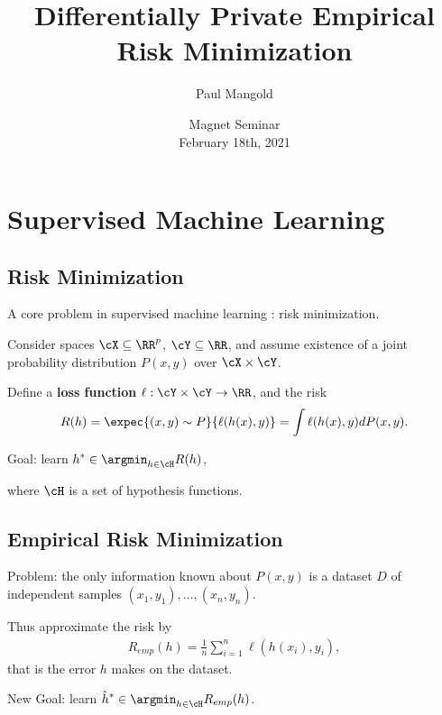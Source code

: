 \documentclass[notheorems]{beamer}
\title{Differentially Private Empirical Risk Minimization}
\author{Paul Mangold}
\date{Magnet Seminar \\[1em]
  February 18th, 2021}
\begin{document}

\begin{notitle}
  \begin{frame}
    \titlepage
  \end{frame}
  \addtocounter{framenumber}{-1}
\end{notitle}

\section{Supervised Machine Learning}
\label{sec:supervised_machine_learning}

\subsection{Risk Minimization}
\label{sub:risk_minimization}



\begin{frame}
  A core problem in supervised machine learning : risk minimization.

  \vspace{1em}

  Consider spaces $\cX \subseteq \RR^p$, $\cY \subseteq \RR$, and assume existence of a joint probability distribution $P(x, y)$ over $\cX \times \cY$.

  \vspace{1em}

  Define a \textbf{loss function} $\ell : \cY \times \cY \rightarrow \RR$, and the risk
  \begin{align}
    R(h) = \expec{(x,y) \sim P}{\ell(h(x), y)} = \int \ell(h(x), y) dP(x, y).
  \end{align}

  \vspace{1em}

  Goal: learn $\displaystyle h^* \in \argmin_{h \in \cH} R(h)$,

  \quad where $\cH$ is a set of hypothesis functions.
\end{frame}


\subsection{Empirical Risk Minimization}
\label{sub:empirical_risk_minimization}


\begin{frame}
  Problem: the only information known about $P(x, y)$ is a dataset $D$ of independent samples $(x_1, y_1), \dots, (x_n, y_n)$.

  \vspace{1em}

  Thus approximate the risk by
  \begin{align}
    R_{emp}(h) = \frac 1n \sum_{i=1}^n \ell(h(x_i), y_i),
  \end{align}
  that is the error $h$ makes on the dataset.

  \vspace{1em}

  New Goal: learn $\displaystyle \hat h^* \in \argmin_{h \in \cH} R_{emp}(h)$.
\end{frame}
\end{document}
